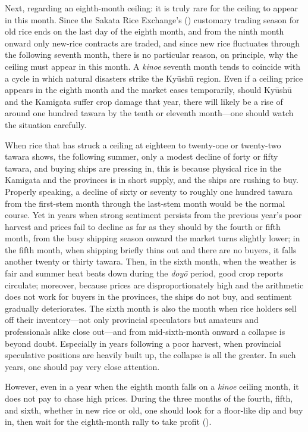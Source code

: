 Next, regarding an eighth-month ceiling: it is truly rare for the
ceiling to appear in this month. Since the Sakata Rice Exchange's
() customary trading season for old
rice ends on the last day of the eighth month, and from the ninth month
onward only new-rice contracts are traded, and since new rice fluctuates
through the following seventh month, there is no particular reason, on
principle, why the ceiling must appear in this month. A \textit{kinoe}
seventh month tends to coincide with a cycle in which natural disasters
strike the Ky\=ush\=u region. Even if a ceiling price appears in the
eighth month and the market eases temporarily, should Ky\=ush\=u and
the Kamigata suffer crop damage that year, there will likely be a rise
of around one hundred tawara by the tenth or eleventh month---one should
watch the situation carefully.

When rice that has struck a ceiling at eighteen to twenty-one or
twenty-two tawara shows, the following summer, only a modest decline of
forty or fifty tawara, and buying ships are pressing in, this is because
physical rice in the Kamigata and the provinces is in short supply, and
the ships are rushing to buy. Properly speaking, a decline of sixty or
seventy to roughly one hundred tawara from the first-stem month through
the last-stem month would be the normal course. Yet in years when strong
sentiment persists from the previous year's poor harvest and prices fail
to decline as far as they should by the fourth or fifth month, from the
busy shipping season onward the market turns slightly lower; in the
fifth month, when shipping briefly thins out and there are no buyers, it
falls another twenty or thirty tawara. Then, in the sixth month, when
the weather is fair and summer heat beats down during the \textit{doy\=o}
period, good crop reports circulate; moreover, because prices are
disproportionately high and the arithmetic does not work for buyers in
the provinces, the ships do not buy, and sentiment gradually
deteriorates. The sixth month is also the month when rice holders sell
off their inventory---not only provincial speculators but amateurs and
professionals alike close out---and from mid-sixth-month onward a
collapse is beyond doubt. Especially in years following a poor harvest,
when provincial speculative positions are heavily built up, the collapse
is all the greater. In such years, one should pay very close attention.

However, even in a year when the eighth month falls on a \textit{kinoe}
ceiling month, it does not pay to chase high prices. During the three
months of the fourth, fifth, and sixth, whether in new rice or old, one
should look for a floor-like dip and buy in, then wait for the
eighth-month rally to take profit ().

